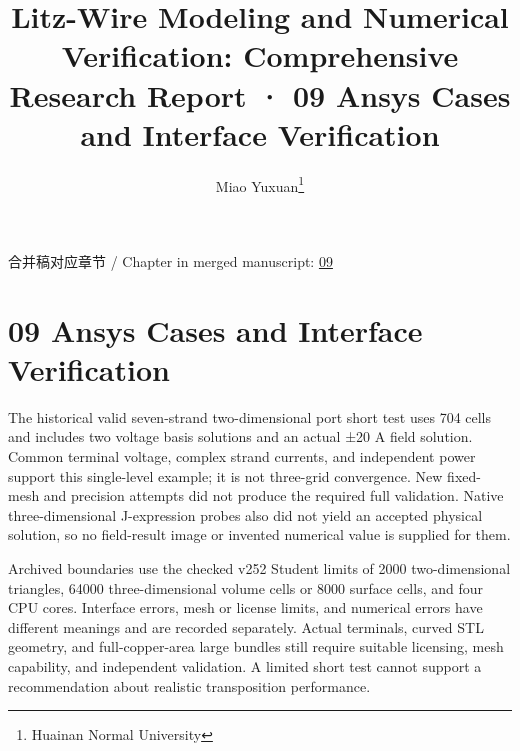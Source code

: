 \documentclass[journal,10pt]{IEEEtran}
\begin{document}
\title{Litz-Wire Modeling and Numerical Verification: Comprehensive Research Report · 09 Ansys Cases and Interface Verification}
\author{Miao Yuxuan\thanks{Huainan Normal University}}

\maketitle
\noindent 合并稿对应章节 / Chapter in merged manuscript: \href{report_en_ieee.pdf#chapter-09}{09}\par
\FloatBarrier
\section*{09 Ansys Cases and Interface Verification}
\hypertarget{chapter-09}{}
The historical valid seven-strand two-dimensional port short test uses 704 cells and includes two voltage basis solutions and an actual ±20 A field solution. Common terminal voltage, complex strand currents, and independent power support this single-level example; it is not three-grid convergence. New fixed-mesh and precision attempts did not produce the required full validation. Native three-dimensional J-expression probes also did not yield an accepted physical solution, so no field-result image or invented numerical value is supplied for them.


Archived boundaries use the checked v252 Student limits of 2000 two-dimensional triangles, 64000 three-dimensional volume cells or 8000 surface cells, and four CPU cores. Interface errors, mesh or license limits, and numerical errors have different meanings and are recorded separately. Actual terminals, curved STL geometry, and full-copper-area large bundles still require suitable licensing, mesh capability, and independent validation. A limited short test cannot support a recommendation about realistic transposition performance.
\end{document}
